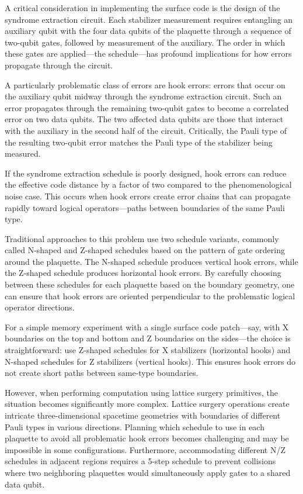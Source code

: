 \documentclass[twocolumn,
aps,
prx,
showpacs,
amsmath,
amssymb,
floatfix,
longbibliography,
superscriptaddress,
eprint]
{revtex4-1}
\begin{document}
A critical consideration in implementing the surface code is the design of the syndrome extraction circuit.
Each stabilizer measurement requires entangling an auxiliary qubit with the four data qubits of the plaquette through a sequence of two-qubit gates, followed by measurement of the auxiliary.
The order in which these gates are applied---the schedule---has profound implications for how errors propagate through the circuit.

A particularly problematic class of errors are hook errors: errors that occur on the auxiliary qubit midway through the syndrome extraction circuit.
Such an error propagates through the remaining two-qubit gates to become a correlated error on two data qubits.
The two affected data qubits are those that interact with the auxiliary in the second half of the circuit.
Critically, the Pauli type of the resulting two-qubit error matches the Pauli type of the stabilizer being measured.

If the syndrome extraction schedule is poorly designed, hook errors can reduce the effective code distance by a factor of two compared to the phenomenological noise case.
This occurs when hook errors create error chains that can propagate rapidly toward logical operators---paths between boundaries of the same Pauli type.

Traditional approaches to this problem use two schedule variants, commonly called N-shaped and Z-shaped schedules based on the pattern of gate ordering around the plaquette.
The N-shaped schedule produces vertical hook errors, while the Z-shaped schedule produces horizontal hook errors.
By carefully choosing between these schedules for each plaquette based on the boundary geometry, one can ensure that hook errors are oriented perpendicular to the problematic logical operator directions.

For a simple memory experiment with a single surface code patch---say, with X boundaries on the top and bottom and Z boundaries on the sides---the choice is straightforward: use Z-shaped schedules for X stabilizers (horizontal hooks) and N-shaped schedules for Z stabilizers (vertical hooks).
This ensures hook errors do not create short paths between same-type boundaries.

However, when performing computation using lattice surgery primitives, the situation becomes significantly more complex.
Lattice surgery operations create intricate three-dimensional spacetime geometries with boundaries of different Pauli types in various directions.
Planning which schedule to use in each plaquette to avoid all problematic hook errors becomes challenging and may be impossible in some configurations.
Furthermore, accommodating different N/Z schedules in adjacent regions requires a 5-step schedule to prevent collisions where two neighboring plaquettes would simultaneously apply gates to a shared data qubit.
\end{document}

